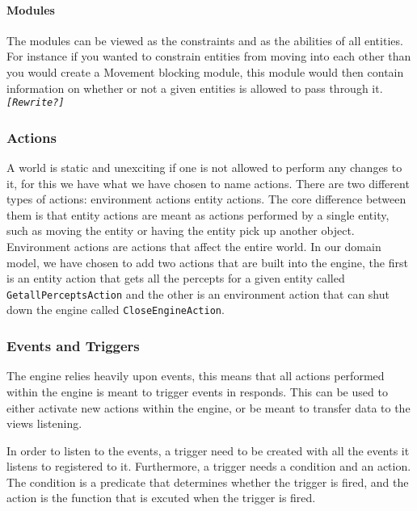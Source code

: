\paragraph*{Modules}

The modules can be viewed as the constraints and as the abilities
of all entities. For instance if you wanted to constrain entities
from moving into each other than you would create a Movement blocking
module, this module would then contain information on whether or not
a given entities is allowed to pass through it. \texttt{\emph{{[}Rewrite?{]}}}


\subsubsection{Actions}

A world is static and unexciting if one is not allowed to perform
any changes to it, for this we have what we have chosen to name actions.
There are two different types of actions: environment actions entity
actions. The core difference between them is that entity actions are
meant as actions performed by a single entity, such as moving the
entity or having the entity pick up another object. Environment actions
are actions that affect the entire world. In our domain model, we
have chosen to add two actions that are built into the engine, the
first is an entity action that gets all the percepts for a given entity
called \texttt{GetallPerceptsAction} and the other is an environment
action that can shut down the engine called \texttt{CloseEngineAction}. 


\subsubsection{Events and Triggers}

The engine relies heavily upon events, this means that all actions
performed within the engine is meant to trigger events in responds.
This can be used to either activate new actions within the engine,
or be meant to transfer data to the views listening. 

In order to listen to the events, a trigger need to be created with
all the events it listens to registered to it. Furthermore, a trigger
needs a condition and an action. The condition is a predicate that
determines whether the trigger is fired, and the action is the function
that is excuted when the trigger is fired.
